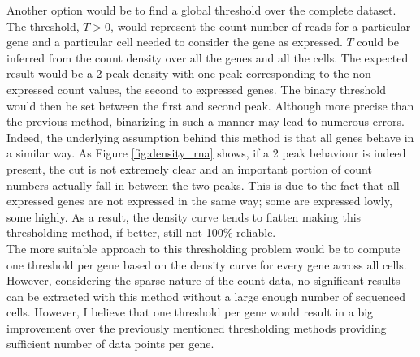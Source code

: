   Another option would be to find a global threshold over the complete dataset. The threshold, $T>0$, would represent the count number of reads for a particular gene and a particular cell needed to consider the gene as expressed. $T$ could be inferred from the count density over all the genes and all the cells. The expected result would be a 2 peak density with one peak corresponding to the non expressed count values, the second to expressed genes. The binary threshold would then be set between the first and second peak. Although more precise than the previous method, binarizing in such a manner may lead to numerous errors. Indeed, the underlying assumption behind this method is that all genes behave in a similar way. As Figure \ref{fig:density_rna} shows, if a 2 peak behaviour is indeed present, the cut is not extremely clear and an important portion of count numbers actually fall in between the two peaks. This is due to the fact that all expressed genes are not expressed in the same way; some are expressed lowly, some highly. As a result, the density curve tends to flatten making this thresholding method, if better, still not 100\% reliable.\\
  
  The more suitable approach to this thresholding problem would be to compute one threshold per gene based on the density curve for every gene across all cells. However, considering the sparse nature of the count data, no significant results can be extracted with this method without a large enough number of sequenced cells. However, I believe that one threshold per gene would result in a big improvement over the previously mentioned thresholding methods providing sufficient number of data points per gene.

